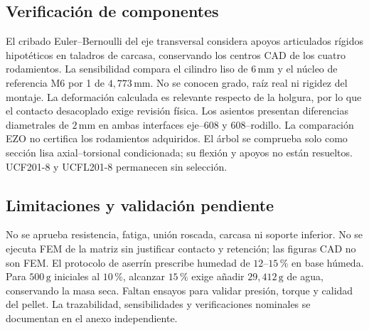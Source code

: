 \subsection{Verificación de componentes}
El cribado Euler--Bernoulli del eje transversal considera apoyos articulados rígidos hipotéticos
en taladros de carcasa, conservando los centros CAD de los cuatro rodamientos.
La sensibilidad compara el cilindro liso de $6\,\mathrm{mm}$ y el núcleo de referencia
M6 por 1 de $4,773\,\mathrm{mm}$\parencite{tr_rosca_m6_2026}.
No se conocen grado, raíz real ni rigidez del montaje. La deformación calculada es relevante
respecto de la holgura, por lo que el contacto desacoplado exige revisión física.
Los asientos presentan diferencias diametrales de $2\,\mathrm{mm}$ en ambas interfaces
eje--608 y 608--rodillo. La comparación EZO\parencite{ezo_608zz_2026} no certifica los rodamientos adquiridos.
El árbol se comprueba solo como sección lisa axial--torsional condicionada;
su flexión y apoyos no están resueltos. UCF201-8 y UCFL201-8 permanecen sin selección.
\subsection{Limitaciones y validación pendiente}
No se aprueba resistencia, fatiga, unión roscada, carcasa ni soporte inferior.
No se ejecuta FEM de la matriz sin justificar contacto y retención; las figuras CAD no son FEM.
El protocolo de aserrín prescribe humedad de $12$--$15\,\%$ en base húmeda.
Para $500\,\mathrm{g}$ iniciales al $10\,\%$, alcanzar $15\,\%$ exige añadir $29,412\,\mathrm{g}$
de agua, conservando la masa seca. Faltan ensayos para validar presión, torque y calidad del pellet.
La trazabilidad, sensibilidades y verificaciones nominales se documentan en el anexo independiente.

